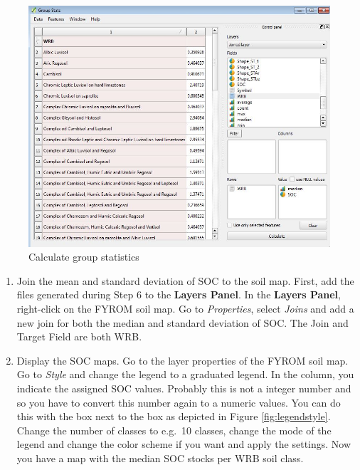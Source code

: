 \documentclass[10pt,b5paper,]{book}
\providecommand{\tightlist}{%
  \setlength{\itemsep}{0pt}\setlength{\parskip}{0pt}}
\theoremstyle{definition}
\theoremstyle{definition}
\theoremstyle{definition}
\theoremstyle{remark}
\begin{document}
\begin{figure}

{\centering \includegraphics[width=0.8\linewidth]{images/Conv_upscaling6} 

}

\caption{Calculate group statistics}\label{fig:groupstats}
\end{figure}

\begin{enumerate}
\def\labelenumi{\arabic{enumi}.}
\setcounter{enumi}{6}
\tightlist
\item
  Join the mean and standard deviation of SOC to the soil map. First,
  add the files generated during Step 6 to the \textbf{Layers Panel}. In
  the \textbf{Layers Panel}, right-click on the FYROM soil map. Go to
  \emph{Properties}, select \emph{Joins} and add a new join for both the
  median and standard deviation of SOC. The Join and Target Field are
  both WRB.
\item
  Display the SOC maps. Go to the layer properties of the FYROM soil
  map. Go to \emph{Style} and change the legend to a graduated legend.
  In the column, you indicate the assigned SOC values. Probably this is
  not a integer number and so you have to convert this number again to a
  numeric values. You can do this with the box next to the box as
  depicted in Figure \ref{fig:legendstyle}. Change the number of classes
  to e.g.~10 classes, change the mode of the legend and change the color
  scheme if you want and apply the settings. Now you have a map with the
  median SOC stocks per WRB soil class.
\end{enumerate}
\end{document}
